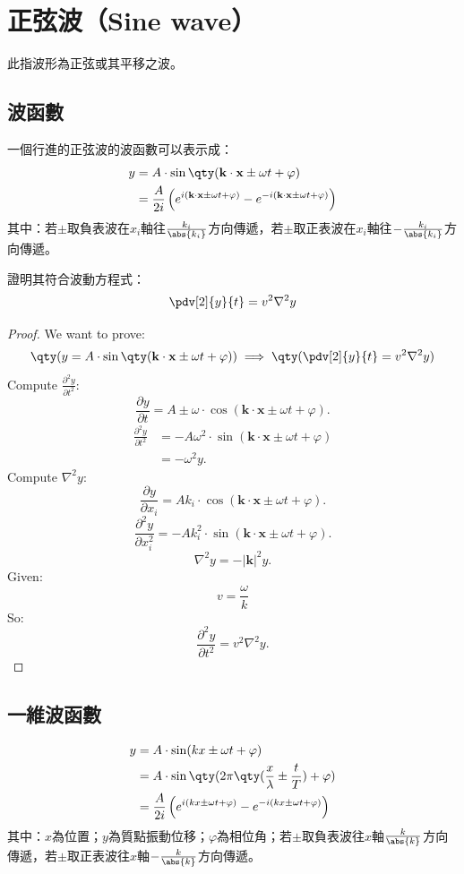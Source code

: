 \documentclass[a4paper,12pt]{report}
\begin{document}
\section{正弦波（Sine wave）}
此指波形為正弦或其平移之波。
\subsection{波函數}
一個行進的正弦波的波函數可以表示成：
\[\begin{aligned}
y &= A \cdot \sin\qty(\mathbf{k} \cdot \mathbf{x} \pm \omega t + \varphi) \\
&= \frac{A}{2i} \left(e^{i(\mathbf{k} \cdot \mathbf{x} \pm \omega t + \varphi)} - e^{-i(\mathbf{k} \cdot \mathbf{x} \pm \omega t + \varphi)} \right)
\end{aligned}\]
其中：若$\pm$取負表波在$x_i$軸往$\frac{k_i}{\abs{k_i}}$方向傳遞，若$\pm$取正表波在$x_i$軸往$-\frac{k_i}{\abs{k_i}}$方向傳遞。

證明其符合波動方程式：
\[\pdv[2]{y}{t}=v^2\nabla^2y\]
\begin{proof}
We want to prove:
\[ \qty(y = A \cdot \sin\qty(\mathbf{k} \cdot \mathbf{x} \pm \omega t + \varphi))\implies\qty(\pdv[2]{y}{t}=v^2\nabla^2y)\]
Compute \(\frac{\partial^2 y}{\partial t^2}\):
\[\frac{\partial y}{\partial t} = A \pm\omega \cdot \cos\left(\mathbf{k} \cdot \mathbf{x} \pm \omega t + \varphi\right).\]
\[\begin{aligned}
\frac{\partial^2 y}{\partial t^2} &= -A \omega^2 \cdot \sin\left(\mathbf{k} \cdot \mathbf{x} \pm \omega t + \varphi\right)\\
&= -\omega^2 y.
\end{aligned}\]
Compute \(\nabla^2 y\):
\[
\frac{\partial y}{\partial x_i} = Ak_i \cdot \cos\left(\mathbf{k} \cdot \mathbf{x} \pm \omega t + \varphi\right).
\]
\[
\frac{\partial^2 y}{\partial x_i^2} = -Ak_i^2 \cdot \sin\left(\mathbf{k} \cdot \mathbf{x} \pm \omega t + \varphi\right).
\]
\[
\nabla^2 y = -|\mathbf{k}|^2 y.
\]
Given:
\[
v = \frac{\omega}{k}
\]
So:
\[
\frac{\partial^2 y}{\partial t^2} = v^2 \nabla^2 y.
\]
\end{proof}
\subsection{一維波函數}
\[\begin{aligned}
y &=A\cdot\sin(kx\pm\omega t+\varphi)\\
&= A\cdot\sin\qty(2\pi\qty(\frac{x}{\lambda}\pm\frac{t}{T})+\varphi)\\
&= \frac{A}{2i} \left(e^{i(kx \pm \omega t + \varphi)} - e^{-i(kx \pm \omega t + \varphi)} \right)
\end{aligned}\]
其中：$x$為位置；$y$為質點振動位移；$\varphi$為相位角；若$\pm$取負表波往$x$軸$\frac{k}{\abs{k}}$方向傳遞，若$\pm$取正表波往$x$軸$-\frac{k}{\abs{k}}$方向傳遞。
\end{document}
